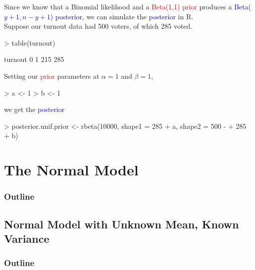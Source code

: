 \documentclass{beamer}
\begin{document}
\begin{frame}[fragile]
Since we know that a Binomial likelihood and a
\textcolor{red}{Beta(1,1) prior} produces a \textcolor{blue}{Beta($y+1,
n-y+1$) posterior}, we can simulate the \textcolor{blue}{posterior} in R.\\
\pause
\bigskip
Suppose our turnout data had 500 voters, of which 285 voted.
\pause
\medskip
\tiny{

\begin{Schunk}
\begin{Sinput}
> table(turnout)
\end{Sinput}
\begin{Soutput}
turnout
  0   1 
215 285 
\end{Soutput}
\end{Schunk}
} 
\pause
\bigskip
\normalsize{
Setting our \textcolor{red}{prior} parameters at $\alpha = 1$ and $\beta = 1$,
}
\medskip
\pause
\tiny{
\begin{Schunk}
\begin{Sinput}
> a <- 1
> b <- 1
\end{Sinput}
\end{Schunk}
} 
\pause
\bigskip
\normalsize{
we get the \textcolor{blue}{posterior}
}
\medskip
\pause
\tiny{
\begin{Schunk}
\begin{Sinput}
> posterior.unif.prior <- rbeta(10000, shape1 = 285 + a, shape2 = 500 - 
+     285 + b)
\end{Sinput}
\end{Schunk}
}
\normalsize
\end{frame}

\section{The Normal Model}

\begin{frame}
\frametitle{Outline}
\tableofcontents[currentsection]
\end{frame}

\subsection{Normal Model with Unknown Mean, Known Variance}

\begin{frame}
\frametitle{Outline}
\tableofcontents[currentsubsection]
\end{frame}
\end{document}
